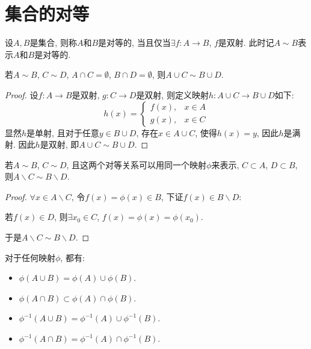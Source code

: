\documentclass[theorem=false,mathfont=none,openany,sub3section]{easybook}
\begin{document}
\newpage

\section{集合的对等}

\begin{definition}
  设$A,B$是集合, 则称$A$和$B$是对等的, 当且仅当$\exists f:A\to B$, $f$是双射. 此时记$A\sim B$表示$A$和$B$是对等的.\par
\end{definition}

\begin{lemma}
  若$A\sim B$, $C \sim D$, $A\cap C=\emptyset$, $B\cap D=\emptyset$, 则$A\cup C\sim B\cup D$.\par
\end{lemma}

\begin{proof}
  设$f:A\to B$是双射, $g:C\to D$是双射, 则定义映射$h:A\cup C\to B\cup D$如下:
  \begin{equation*}
    h(x)=
    \begin{cases}
      f(x), & x\in A\\
      g(x), & x\in C
    \end{cases}
  \end{equation*}
  显然$h$是单射, 且对于任意$y\in B\cup D$, 存在$x\in A\cup C$, 使得$h(x)=y$, 因此$h$是满射. 因此$h$是双射, 即$A\cup C\sim B\cup D$.\par
\end{proof}

\begin{theorem}
  若$A\sim B$, $C \sim D$, 且这两个对等关系可以用同一个映射$\phi$来表示, $C\subset A$, $D\subset B$, 则$A\backslash C\sim B\backslash D$.\par
\end{theorem}

\begin{proof}
  $\forall x \in A\backslash C$, 令$f(x)=\phi(x)\in B$, 下证$f(x)\in B\backslash D$:\par
  若$f(x)\in D$, 则$\exists x_0 \in C$, $f(x)= \phi(x)= \phi(x_0)$.\par
  于是$A\backslash C\sim B\backslash D$.\par
\end{proof}

\begin{proposition}
  对于任何映射$\phi$, 都有:\par
  \begin{itemize}
    \item $\phi(A\cup B) = \phi(A)\cup \phi(B)$.
    \item $\phi(A\cap B) \subset \phi(A)\cap \phi(B)$.
    \item $\phi^{-1}(A\cup B) = \phi^{-1}(A)\cup \phi^{-1}(B)$.
    \item $\phi^{-1}(A\cap B) = \phi^{-1}(A)\cap \phi^{-1}(B)$.
  \end{itemize}
\end{proposition}
\end{document}
